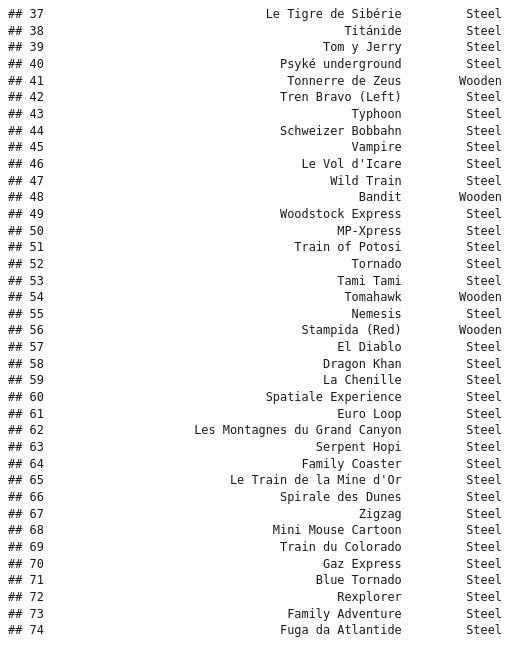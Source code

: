 \documentclass[
]{article}
\begin{document}
\begin{verbatim}
## 37                               Le Tigre de Sibérie         Steel
## 38                                          Titánide         Steel
## 39                                       Tom y Jerry         Steel
## 40                                 Psyké underground         Steel
## 41                                  Tonnerre de Zeus        Wooden
## 42                                 Tren Bravo (Left)         Steel
## 43                                           Typhoon         Steel
## 44                                 Schweizer Bobbahn         Steel
## 45                                           Vampire         Steel
## 46                                    Le Vol d'Icare         Steel
## 47                                        Wild Train         Steel
## 48                                            Bandit        Wooden
## 49                                 Woodstock Express         Steel
## 50                                         MP-Xpress         Steel
## 51                                   Train of Potosi         Steel
## 52                                           Tornado         Steel
## 53                                         Tami Tami         Steel
## 54                                          Tomahawk        Wooden
## 55                                           Nemesis         Steel
## 56                                    Stampida (Red)        Wooden
## 57                                         El Diablo         Steel
## 58                                       Dragon Khan         Steel
## 59                                       La Chenille         Steel
## 60                               Spatiale Experience         Steel
## 61                                         Euro Loop         Steel
## 62                     Les Montagnes du Grand Canyon         Steel
## 63                                      Serpent Hopi         Steel
## 64                                    Family Coaster         Steel
## 65                          Le Train de la Mine d'Or         Steel
## 66                                 Spirale des Dunes         Steel
## 67                                            Zigzag         Steel
## 68                                Mini Mouse Cartoon         Steel
## 69                                 Train du Colorado         Steel
## 70                                       Gaz Express         Steel
## 71                                      Blue Tornado         Steel
## 72                                         Rexplorer         Steel
## 73                                  Family Adventure         Steel
## 74                                 Fuga da Atlantide         Steel

\end{verbatim}
\end{document}

